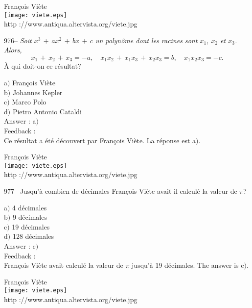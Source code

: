 \documentclass[letterpaper, 12pt]{article}
\begin{document}
        \begin{center}
        Fran\c cois Vi\`ete\\
    \texttt{[image: viete.eps]}\\
        {\footnotesize http ://www.antiqua.altervista.org/viete.jpg}
    \end{center}

976-- {\sl Soit $x^3\,+\,ax^2\,+\,bx\,+\,c$ un polyn\^ome dont les
racines sont $x_1$, $x_2$ et $x_3$. Alors,
$$x_1\,+\,x_2\,+\,x_3=-a,\quad x_1x_2\,+\,x_1x_3\,+\,x_2x_3=b,\quad
x_1x_2x_3=-c.$$}
\`A qui doit-on ce r\'esultat?

a$)$ Fran\c cois Vi\`ete \\
b$)$ Johannes Kepler  \\
c$)$ Marco Polo  \\
d$)$ Pietro Antonio Cataldi\\

Answer : a$)$\\

Feedback : \\
Ce r\'esultat a \'et\'e d\'ecouvert par Fran\c cois Vi\`ete. La
r\'eponse est a$)$.

        \begin{center}
        Fran\c cois Vi\`ete\\
    \texttt{[image: viete.eps]}\\
        {\footnotesize http ://www.antiqua.altervista.org/viete.jpg}
    \end{center}

977-- Jusqu'\`a combien de d\'ecimales Fran\c cois Vi\`ete avait-il
calcul\'e la valeur de $\pi$?

a$)$ 4 d\'ecimales\\
b$)$ 9 d\'ecimales \\
c$)$ 19 d\'ecimales \\
d$)$ 128 d\'ecimales\\

Answer : c$)$\\

Feedback : \\
Fran\c cois Vi\`ete avait calcul\'e la valeur de $\pi$ jusqu'\`a 19
d\'ecimales. The answer is c$)$.

        \begin{center}
        Fran\c cois Vi\`ete\\
    \texttt{[image: viete.eps]}\\
        {\footnotesize http ://www.antiqua.altervista.org/viete.jpg}
    \end{center}
\end{document}
